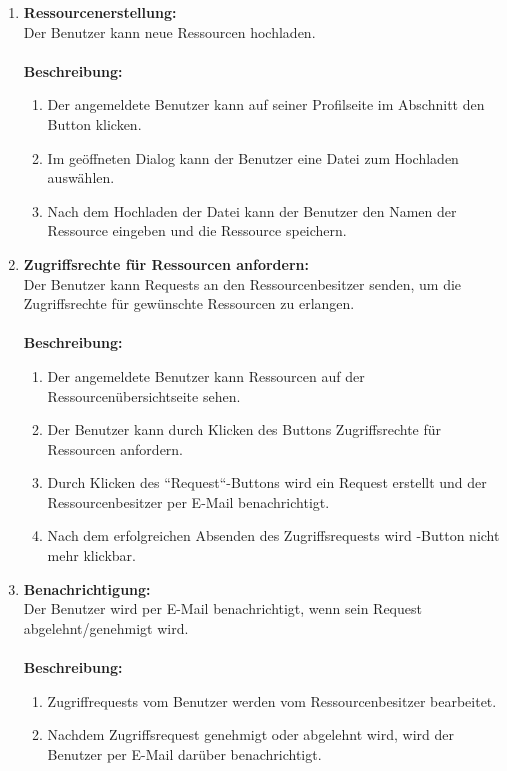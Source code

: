 \documentclass[parskip=full,11pt]{scrartcl}
\def\threedigits#1{%
  \ifnum#1<10 0\fi
  \ifnum#1<1 0\fi
  \number#1}
\begin{document}
\begin{enumerate}[label={\textbf{/F\protect\threedigits{\theenumi}0/}}, leftmargin=*]
\item \label{FAB4} \textbf{Ressourcenerstellung:}\\ Der Benutzer kann neue Ressourcen hochladen.\\\\
\textbf{Beschreibung:}\\
\begin{enumerate}[label=(\arabic*), leftmargin=*]
\item Der angemeldete Benutzer kann auf seiner Profilseite im Abschnitt \grqq \: den Button \grqq \: klicken.
\item Im geöffneten Dialog kann der Benutzer eine Datei zum Hochladen auswählen.
\item Nach dem Hochladen der Datei kann der Benutzer den Namen der Ressource eingeben und die Ressource speichern.  
\end{enumerate}

\item \label{FAB5} \textbf{Zugriffsrechte für Ressourcen anfordern:}\\ Der Benutzer kann Requests an den Ressourcenbesitzer senden, um die Zugriffsrechte für gewünschte Ressourcen zu erlangen.\\\\
\textbf{Beschreibung:}\\
\begin{enumerate}[label=(\arabic*), leftmargin=*]
\item Der angemeldete Benutzer kann Ressourcen auf der Ressourcenübersichtseite sehen.
\item Der Benutzer kann durch Klicken des Buttons \grqq \: Zugriffsrechte für Ressourcen anfordern.
\item Durch Klicken des ``Request``-Buttons wird ein Request erstellt und der Ressourcenbesitzer per E-Mail benachrichtigt.
\item Nach dem erfolgreichen Absenden des Zugriffsrequests wird  \grqq -Button nicht mehr klickbar.
\end{enumerate}
\newpage

\item \label{FAB6} \textbf{Benachrichtigung:}\\ Der Benutzer wird per E-Mail benachrichtigt, wenn sein Request abgelehnt/genehmigt wird.\\\\
\textbf{Beschreibung:}\\
\begin{enumerate}[label=(\arabic*), leftmargin=*]
\item Zugriffrequests vom Benutzer werden vom Ressourcenbesitzer bearbeitet.
\item Nachdem Zugriffsrequest genehmigt oder abgelehnt wird, wird der Benutzer per E-Mail darüber benachrichtigt.
\end{enumerate} 


\end{enumerate}
\end{document}
